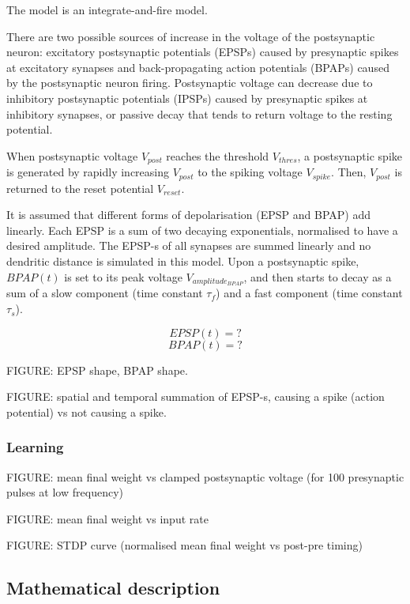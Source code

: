 \documentclass[a4paper,12pt]{report}
\theoremstyle{definition}
\begin{document}
The model is an integrate-and-fire model.

There are two possible sources of increase in the voltage of the postsynaptic neuron: excitatory postsynaptic potentials (EPSPs) caused by presynaptic spikes at excitatory synapses and back-propagating action potentials (BPAPs) caused by the postsynaptic neuron firing. Postsynaptic voltage can decrease due to inhibitory postsynaptic potentials (IPSPs) caused by presynaptic spikes at inhibitory synapses, or passive decay that tends to return voltage to the resting potential.

When postsynaptic voltage $V_{post}$ reaches the threshold $V_{thres}$, a postsynaptic spike is generated by rapidly increasing $V_{post}$ to the spiking voltage $V_{spike}$. Then, $V_{post}$ is returned to the reset potential $V_{reset}$.

It is assumed that different forms of depolarisation (EPSP and BPAP) add linearly. 
Each EPSP is a sum of two decaying exponentials, normalised to have a desired amplitude. The EPSP-s of all synapses are summed linearly and no dendritic distance is simulated in this model. Upon a postsynaptic spike, $BPAP(t)$ is set to its peak voltage $V_{amplitude_{BPAP}}$, and then starts to decay as a sum of a slow component (time constant $\tau_f$) and a fast component (time constant $\tau_s$).

$$ EPSP(t) = ? $$
$$ BPAP(t) = ? $$


FIGURE: EPSP shape, BPAP shape.

FIGURE: spatial and temporal summation of EPSP-s, causing a spike (action potential) vs not causing a spike.



\subsubsection{Learning}

FIGURE: mean final weight vs clamped postsynaptic voltage (for 100 presynaptic pulses at low frequency)

FIGURE: mean final weight vs input rate

FIGURE: STDP curve (normalised mean final weight vs post-pre timing)


\subsection{Mathematical description}
\end{document}
